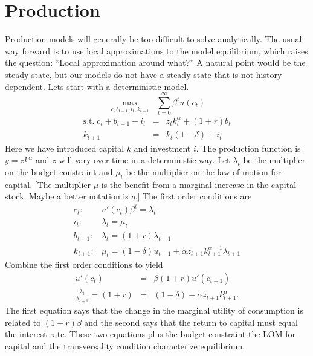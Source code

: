 \documentclass[11pt,pdftex,twoside,letterpaper]{exam}
\begin{document}
\section{Production}
Production models will generally be too difficult to solve analytically. The usual way forward is to use local approximations to the model equilibrium, which raises the question: ``Local approximation around what?'' A natural point would be the steady state, but our models do not have a steady state that is not history dependent. Lets start with a deterministic model.
\begin{equation}
 \max_{c,b_{t+1}, i_t, k_{t+1}} \;\; \sum_{t=0}^\infty  \beta^tu(c_t)
\end{equation}
\begin{eqnarray}
  \textrm{s.t.} \; c_{t} +b_{t+1} +i_t &=& z_tk_t^\alpha+(1+r)b_t\\
  k_{t+1}&=& k_t(1-\delta)+i_t
\end{eqnarray}
Here we have introduced capital $k$ and investment $i$. The production function is $y=zk^\alpha$ and $z$ will vary over time in a deterministic way. Let $\lambda_t$ be the multiplier on the budget constraint and $\mu_t$ be the multiplier on the law of motion for capital. [The multiplier $\mu$ is the benefit from a marginal increase in the capital stock. Maybe a better notation is $q$.] The first order conditions are
\begin{eqnarray}
  c_t:&u'(c_t)\beta^t = \lambda_t\\
  i_t: &\lambda_t=\mu_t\\
  b_{t+1}:&\lambda_t=(1+r)\lambda_{t+1}\\
  k_{t+1}:&\mu_t=(1-\delta)u_{t+1}+\alpha z_{t+1}k_{t+1}^{\alpha-1}\lambda_{t+1}
\end{eqnarray}
Combine the first order conditions to yield
\begin{eqnarray}
  u'(c_t) &=& \beta(1+r)u'(c_{t+1}) \label{eq:bond-euler}\\
  \frac{\lambda_t}{\lambda_{t+1}}=(1+r)&=&(1-\delta)+\alpha z_{t+1} k_{t+1}^\alpha.
\end{eqnarray}
The first equation says that the change in the marginal utility of consumption is related to $(1+r)\beta$ and the second says that the return to capital must equal the interest rate. These two equations plus the budget constraint the LOM for capital and the transversality condition characterize equilibrium.
\end{document}

